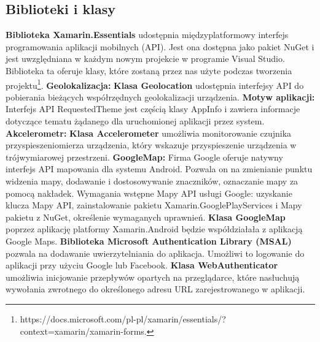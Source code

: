 \subsection{Biblioteki i klasy}
\hspace{1cm} \textbf{Biblioteka Xamarin.Essentials} udostępnia międzyplatformowy interfejs programowania aplikacji mobilnych (API). Jest ona dostępna jako pakiet NuGet i jest uwzględniana w każdym nowym projekcie w programie Visual Studio.
Biblioteka ta oferuje klasy, które zostaną przez nas użyte podczas tworzenia projektu\footnote{https://docs.microsoft.com/pl-pl/xamarin/essentials/?context=xamarin/xamarin-forms\cite{www1}.}.
\newline
\textbf{Geolokalizacja:}
\newline
\textbf{Klasa Geolocation} udostępnia interfejsy API do pobierania bieżących współrzędnych geolokalizacji urządzenia.
\newline
\textbf{Motyw aplikacji:}
\newline
Interfejs API RequestedTheme jest częścią klasy AppInfo i zawiera informacje dotyczące tematu żądanego dla uruchomionej aplikacji przez system.
\newline
\textbf{Akcelerometr:}
\newline
\textbf{Klasa Accelerometer} umożliwia monitorowanie czujnika przyspieszeniomierza urządzenia, który wskazuje przyspieszenie urządzenia w trójwymiarowej przestrzeni.
\newline
\textbf{GoogleMap:}
\newline
Firma Google oferuje natywny interfejs API mapowania dla systemu Android. Pozwala on na zmienianie punktu widzenia mapy, dodawanie i dostosowywanie znaczników, oznaczanie mapy za pomocą nakładek.
\newline
Wymagania wstępne Mapy API usługi Google: uzyskanie klucza Mapy API, zainstalowanie pakietu Xamarin.GooglePlayServices i Mapy pakietu z NuGet, określenie wymaganych uprawnień.
\newline
\textbf{Klasa GoogleMap} poprzez aplikację platformy Xamarin.Android będzie współdziałała z aplikacją Google Maps.
\newline
\newline
\textbf{Biblioteka Microsoft Authentication Library (MSAL)} pozwala na dodawanie uwierzytelniania do aplikacja. Umożliwi to logowanie do aplikacji przy użyciu Google lub Facebook.
\newline
\textbf{Klasa WebAuthenticator} umożliwia inicjowanie przepływów opartych na przeglądarce, które nasłuchują wywołania zwrotnego do określonego adresu URL zarejestrowanego w aplikacji.
\newline

